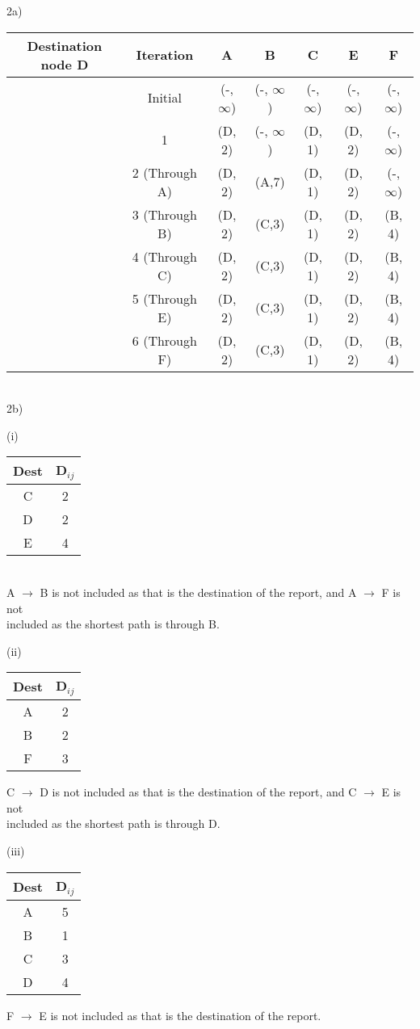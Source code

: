 \documentclass[12pt]{article}
\begin{document}
\noindent 2a)
\begin{table}[h!]
\centering
\begin{tabular}{c|c|c|c|c|c|c}
\toprule
\multirow{11}{*}{Destination node D} & Iteration & A & B & C & E & F\\\bottomrule
& Initial & (-, $\infty$) & (-, $\infty$) & (-, $\infty$) & (-, $\infty$) & (-, $\infty$)\\[.4em]
& 1 & (D, 2) & (-, $\infty$) & (D, 1) & (D, 2) & (-, $\infty$)\\[.4em]
& 2 (Through A) & (D, 2) & (A,7) & (D, 1) & (D, 2) & (-, $\infty$)\\[.4em]
& 3 (Through B) & (D, 2) & (C,3) & (D, 1) & (D, 2) & (B, 4)\\[.4em]
& 4 (Through C) & (D, 2) & (C,3) & (D, 1) & (D, 2) & (B, 4)\\[.4em]
& 5 (Through E) & (D, 2) & (C,3) & (D, 1) & (D, 2) & (B, 4)\\[.4em]
& 6 (Through F) & (D, 2) & (C,3) & (D, 1) & (D, 2) & (B, 4)\\[.4em]
\end{tabular}
\end{table} \\


\noindent 2b)
\begin{table}[h!]
\centering
\indent (i)
\begin{tabular}{c|c}
\toprule
Dest & D$_{ij}$\\\bottomrule
C & 2 \\
D & 2 \\
E & 4 \\\bottomrule
\end{tabular}
\end{table}\\
\indent \indent A $\rightarrow$ B is not included as that is the destination of the report, and A $\rightarrow$ F is not\\
\indent \indent included as the shortest path is through B.\\

\begin{table}[h!]
\centering
\indent (ii)
\begin{tabular}{c|c}
\toprule
Dest & D$_{ij}$\\\bottomrule
A & 2 \\
B & 2 \\
F & 3 \\\bottomrule
\end{tabular}
\end{table}
\indent \indent C $\rightarrow$ D is not included as that is the destination of the report, and C $\rightarrow$ E is not\\
\indent \indent included as the shortest path is through D.\\

\begin{table}[h!]
\centering
\indent (iii)
\begin{tabular}{c|c}
\toprule
Dest & D$_{ij}$\\\bottomrule
A & 5 \\
B & 1 \\
C & 3 \\
D & 4 \\\bottomrule
\end{tabular}
\end{table}
\indent \indent F $\rightarrow$ E is not included as that is the destination of the report.
\end{document}
